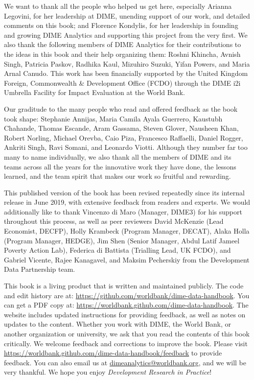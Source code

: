 We want to thank all the people who helped us get here, especially
Arianna Legovini, for her leadership at DIME, unending support of our work,
and detailed comments on this book; and
Florence Kondylis, for her leadership in founding and growing DIME Analytics
and supporting this project from the very first.
We also thank the following members
of DIME Analytics for their contributions
to the ideas in this book and their help organizing them:
Roshni Khincha, Avnish Singh, Patricia Paskov, Radhika Kaul,
Mizuhiro Suzuki, Yifan Powers, and Maria Arnal Canudo.
This work has been financially supported by the United Kingdom Foreign,
Commonwealth \& Development Office (FCDO) through the
 DIME i2i Umbrella Facility for Impact Evaluation at the World Bank.

Our graditude to the many people who read and offered feedback as the book took shape:
Stephanie Annijas,
Maria Camila Ayala Guerrero,
Kaustubh Chahande,
Thomas Escande,
Aram Gassama,
Steven Glover,
Nausheen Khan,
Robert Norling,
Michael Orevba,
Caio Piza,
Francesco Raffaelli,
Daniel Rogger,
Ankriti Singh,
Ravi Somani,
and Leonardo Viotti.
Although they number far too many to name individually,
we also thank all the members of DIME and its teams across all the years
for the innovative work they have done, the lessons learned,
and the team spirit that makes our work so fruitful and rewarding.

This published version of the book has been revised repeatedly
since its internal release in June 2019,
with extensive feedback from readers and experts.
We would additionally like to thank Vincenzo di Maro
(Manager, DIME3) for his support throughout this process,
as well as peer reviewers
David McKenzie (Lead Economist, DECFP),
Holly Krambeck (Program Manager, DECAT),
Alaka Holla (Program Manager, HEDGE),
Jim Shen (Senior Manager, Abdul Latif Jameel Poverty Action Lab),
Federica di Battista (Trialling Lead, UK FCDO),
and Gabriel Vicente, Rajee Kanagavel, and Maksim Pecherskiy
from the Development Data Partnership team.

This book is a living product that is written and maintained publicly.
The code and edit history are at:
\url{https://github.com/worldbank/dime-data-handbook}.
You can get a PDF copy at:
\url{https://worldbank.github.com/dime-data-handbook}.
The website includes updated instructions
for providing feedback, as well as notes on updates to the content.
Whether you work with DIME, the World Bank,
or another organization or university,
we ask that you read the contents of this book critically.
We welcome feedback and corrections to improve the book.
Please visit
\url{https://worldbank.github.com/dime-data-handbook/feedback}
to provide feedback.
You can also email us at \url{dimeanalytics@worldbank.org},
and we will be very thankful.
We hope you enjoy \textit{Development Research in Practice}!
